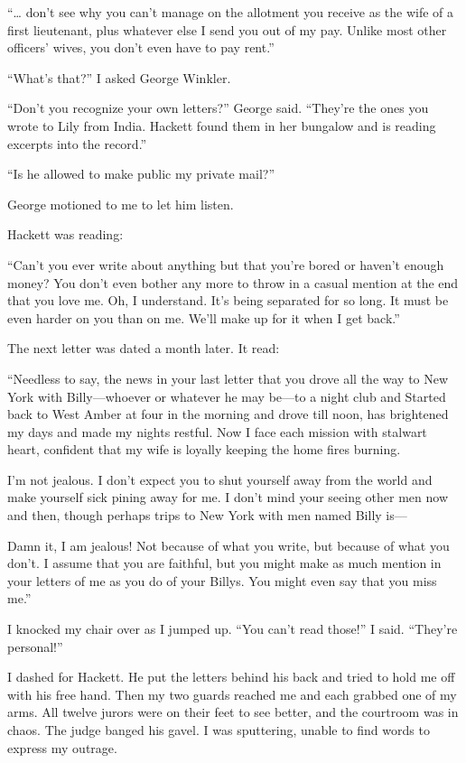 {“… don’t see why you can’t manage on the allotment you receive as the wife of a first lieutenant, plus whatever else I send you out of my pay. Unlike most other officers’ wives, you don’t even have to pay rent.”

“What’s that?” I asked George Winkler.

“Don’t you recognize your own letters?” George said. “They’re the ones you wrote to Lily from India. Hackett found them in her bungalow and is reading excerpts into the record.”

“Is he allowed to make public my private mail?”

George motioned to me to let him listen.

Hackett was reading:

“Can’t you ever write about anything but that you’re bored or haven’t enough money? You don’t even bother any more to throw in a casual mention at the end that you love me. Oh, I understand. It’s being separated for so long. It must be even harder on you than on me. We’ll make up for it when I get back.”

The next letter was dated a month later. It read:

“Needless to say, the news in your last letter that you drove all the way to New York with Billy—whoever or whatever he may be—to a night club and Started back to West Amber at four in the morning and drove till noon, has brightened my days and made my nights restful. Now I face each mission with stalwart heart, confident that my wife is loyally keeping the home fires burning.

I’m not jealous. I don’t expect you to shut yourself away from the world and make yourself sick pining away for me. I don’t mind your seeing other men now and then, though perhaps trips to New York with men named Billy is—

Damn it, I am jealous! Not because of what you write, but because of what you don’t. I assume that you are faithful, but you might make as much mention in your letters of me as you do of your Billys. You might even say that you miss me.”

I knocked my chair over as I jumped up. “You can’t read those!” I said. “They’re personal!”

I dashed for Hackett. He put the letters behind his back and tried to hold me off with his free hand. Then my two guards reached me and each grabbed one of my arms. All twelve jurors were on their feet to see better, and the courtroom was in chaos. The judge banged his gavel. I was sputtering, unable to find words to express my outrage.

}
